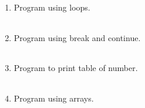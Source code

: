 \documentclass{exam}
\begin{document}
\begin{enumerate}
   \item  Program  using loops.

   \begin{myTableStyle}
   \begin{center} \begin{tabular}{ |m{14cm}| } \hline
              \\ \hline \end{tabular} \end{center}
\end{myTableStyle}
  \pagebreak

   \item  Program  using break and continue.

   \begin{myTableStyle}
   \begin{center} \begin{tabular}{ |m{14cm}| } \hline
              \\ \hline
    \end{tabular} \end{center}
\end{myTableStyle}
  \pagebreak

   \item  Program  to print table of  number.

   \begin{myTableStyle}
   \begin{center} \begin{tabular}{ |m{14cm}| } \hline
              \\ \hline
    \end{tabular} \end{center}
\end{myTableStyle}
  \pagebreak

   \item  Program using arrays.

   \begin{myTableStyle}
   \begin{center} \begin{tabular}{ |m{14cm}| } \hline
              \\ \hline
    \end{tabular} \end{center}
\end{myTableStyle}
  \pagebreak


\end{enumerate}
\end{document}
